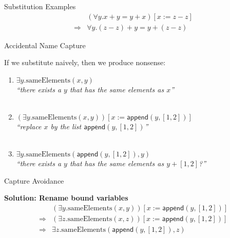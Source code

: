 \documentclass[xetex,aspectratio=169,14pt,hyperref={pdfpagelabels=true,pdflang={en-GB}}]{beamer}
\begin{document}
\begin{frame}
  {Substitution Examples}
  \begin{displaymath}
    \begin{array}{cl}
      &(\forall y. x+y=y+x)[x:=z-z] \\
      \Longrightarrow&\forall y. (z-z)+y = y+(z-z)
    \end{array}
  \end{displaymath}
\end{frame}

\begin{frame}[t]
  {Accidental Name Capture}

  If we substitute naively, then we produce nonsense:
  \begin{enumerate}
  \item $\exists y. \mathrm{sameElements}(x,y)$ \\
    \emph{``there exists a $y$ that has the same elements as $x$''}\\
    ~\\
  \item $(\exists y. \mathrm{sameElements}(x,y))[x:=\mathsf{append}(y,[1,2])]$\\
    \emph{``replace $x$ by the list $\mathsf{append}(y,[1,2])$''}\\
    ~\\
  \item $\exists y. \mathrm{sameElements}(\mathsf{append}(y,[1,2]),y)$\\
    \emph{``there exists a $y$ that has the same elements as $y + [1,2]$?''}
  \end{enumerate}
\end{frame}

\begin{frame}
  {Capture Avoidance}

  \bigskip

  \textbf{Solution: Rename bound variables}
  \begin{displaymath}
    \begin{array}{cl}
      &(\exists y. \mathrm{sameElements}(x,y))[x:=\mathsf{append}(y,[1,2])]\\
      \Longrightarrow&(\exists z. \mathrm{sameElements}(x,z))[x:=\mathsf{append}(y,[1,2])]\\
      \Longrightarrow&\exists z. \mathrm{sameElements}(\mathsf{append}(y,[1,2]),z)
    \end{array}
  \end{displaymath}
\end{frame}
\end{document}

